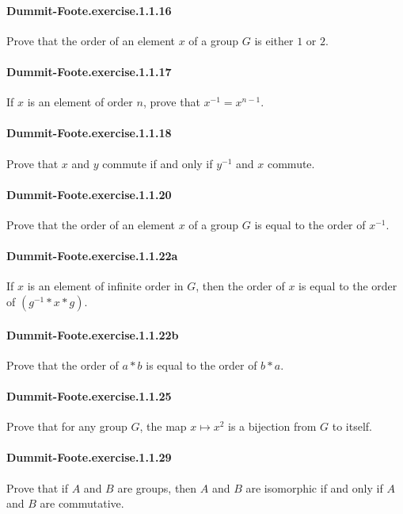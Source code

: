 \documentclass{article}
\begin{document}
\paragraph{Dummit-Foote.exercise.1.1.16} Prove that the order of an element $x$ of a group $G$ is either $1$ or $2$.

\paragraph{Dummit-Foote.exercise.1.1.17} If $x$ is an element of order $n$, prove that $x^{-1} = x^{n-1}$.

\paragraph{Dummit-Foote.exercise.1.1.18} Prove that $x$ and $y$ commute if and only if $y^{-1}$ and $x$ commute.

\paragraph{Dummit-Foote.exercise.1.1.20} Prove that the order of an element $x$ of a group $G$ is equal to the order of $x^{-1}$.

\paragraph{Dummit-Foote.exercise.1.1.22a} If $x$ is an element of infinite order in $G$, then the order of $x$ is equal to the order of $(g^{-1} * x * g)$.

\paragraph{Dummit-Foote.exercise.1.1.22b} Prove that the order of $a*b$ is equal to the order of $b*a$.

\paragraph{Dummit-Foote.exercise.1.1.25} Prove that for any group $G$, the map $x \mapsto x^2$ is a bijection from $G$ to itself.

\paragraph{Dummit-Foote.exercise.1.1.29} Prove that if $A$ and $B$ are groups, then $A$ and $B$ are isomorphic if and only if $A$ and $B$ are commutative.
\end{document}

